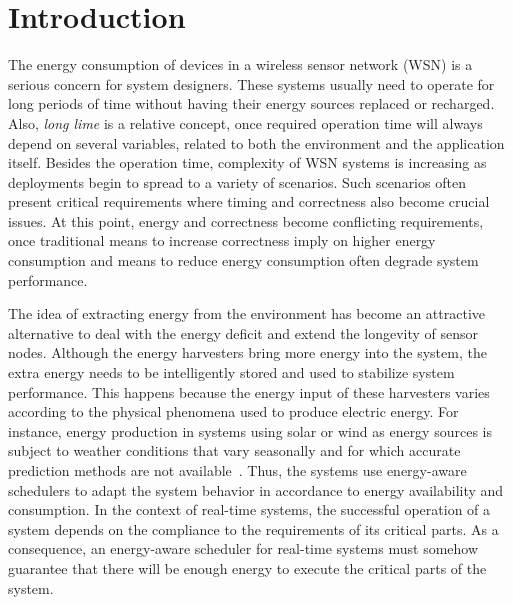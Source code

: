 \section{Introduction}
\label{sec:intro}


The energy consumption of devices in a wireless sensor network (WSN) is a serious concern for system designers.
These systems usually need to operate for long periods of time without having their energy sources replaced or recharged.
Also, \emph{long lime} is a relative concept, once required operation time will always depend on several variables, related to both the environment and the application itself.
Besides the operation time, complexity of WSN systems is increasing as deployments begin to spread to a variety of scenarios.
Such scenarios often present critical requirements where timing and correctness also become crucial issues.
At this point, energy and correctness become conflicting requirements, once traditional means to increase correctness imply on higher energy consumption and means to reduce energy consumption often degrade system performance.

The idea of extracting energy from the environment has become an attractive alternative to deal with the energy deficit and extend the longevity of sensor nodes.
Although the energy harvesters bring more energy into the system, the extra energy needs to be intelligently stored and used to stabilize system performance.
This happens because the energy input of these harvesters varies according to the physical phenomena used to produce electric energy.
For instance, energy production in systems using solar or wind as energy sources is subject to weather conditions that vary seasonally and for which accurate prediction methods are not available~\cite{Fay:2010}.
Thus, the systems use energy-aware schedulers to adapt the system behavior in accordance to energy availability and consumption.
In the context of real-time systems, the successful operation of a system depends on the compliance to the requirements of its critical parts.
As a consequence, an energy-aware scheduler for real-time systems must somehow guarantee that there will be enough energy to execute the critical parts of the system.

